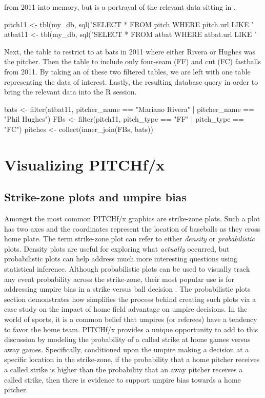 \begin{article}
from 2011 into memory, but is a portrayal of the relevant data sitting
in .
%
\begin{Schunk}
\begin{Sinput}
pitch11 <- tbl(my_db, sql("SELECT * FROM pitch WHERE pitch.url LIKE '%
atbat11 <- tbl(my_db, sql("SELECT * FROM atbat WHERE atbat.url LIKE '%
\end{Sinput}
\end{Schunk}
%
Next,  the  table to restrict to at bats
in 2011 where either Rivera or Hughes was the pitcher. Then 
the  table to include only four-seam (FF) and cut (FC)
fastballs from 2011. By taking an  of these two
filtered tables, we are left with one table representing the data
of interest. Lastly,  the resulting database query
in order to bring the relevant data into the R session.
%
\begin{Schunk}
\begin{Sinput}
bats <- filter(atbat11, 
  pitcher_name == "Mariano Rivera" | pitcher_name == "Phil Hughes")
FBs <- filter(pitch11, pitch_type == "FF" | pitch_type == "FC")
pitches <- collect(inner_join(FBs, bats))
\end{Sinput}
\end{Schunk}
%
\section{Visualizing PITCHf/x}

\subsection{Strike-zone plots and umpire bias}

Amongst the most common PITCHf/x graphics are strike-zone plots. Such
a plot has two axes and the coordinates represent the location of
baseballs as they cross home plate. The term strike-zone plot can
refer to either \emph{density} or \emph{probabilistic} plots. Density
plots are useful for exploring what \emph{actually} occurred, but
probabilistic plots can help address much more interesting questions
using statistical inference. Although probabilistic plots can be used
to visually track any event probability across the strike-zone, their
most popular use is for addressing umpire bias in a strike versus
ball decision \citet{bias}. The probabilistic plots section demonstrates
how  simplifies the process behind creating such plots
via a case study on the impact of home field advantage on umpire decisions.
In the world of sports, it is a common belief that umpires (or referees)
have a tendency to favor the home team. PITCHf/x provides a unique
opportunity to add to this discussion by modeling the probability
of a called strike at home games versus away games. Specifically,
conditioned upon the umpire making a decision at a specific location
in the strike-zone, if the probability that a home pitcher receives
a called strike is higher than the probability that an away pitcher
receives a called strike, then there is evidence to support umpire
bias towards a home pitcher.


\end{article}
